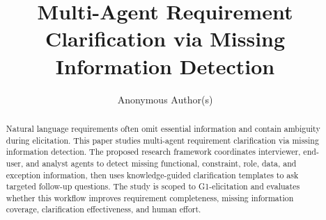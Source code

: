\documentclass[sigconf,anonymous,review]{acmart}
\title{Multi-Agent Requirement Clarification via Missing Information Detection}
\author{Anonymous Author(s)}
\affiliation{
  \institution{Anonymous Institution}
  \country{Anonymous Country}
}
\begin{document}
\begin{abstract}
Natural language requirements often omit essential information and contain ambiguity during elicitation.
This paper studies multi-agent requirement clarification via missing information detection.
The proposed research framework coordinates interviewer, end-user, and analyst agents to detect missing functional, constraint, role, data, and exception information, then uses knowledge-guided clarification templates to ask targeted follow-up questions.
The study is scoped to G1-elicitation and evaluates whether this workflow improves requirement completeness, missing information coverage, clarification effectiveness, and human effort.
\end{abstract}



\maketitle



















\appendix



\end{document}
